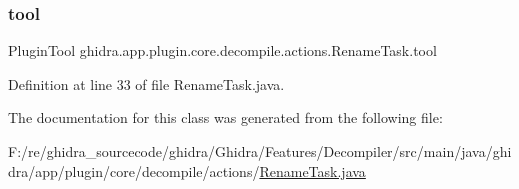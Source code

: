 \subsubsection{\texorpdfstring{tool}{tool}}
{\footnotesize\ttfamily Plugin\+Tool ghidra.\+app.\+plugin.\+core.\+decompile.\+actions.\+Rename\+Task.\+tool\hspace{0.3cm}{\ttfamily [protected]}}



Definition at line 33 of file Rename\+Task.\+java.



The documentation for this class was generated from the following file\+:\begin{DoxyCompactItemize}
\item 
F\+:/re/ghidra\+\_\+sourcecode/ghidra/\+Ghidra/\+Features/\+Decompiler/src/main/java/ghidra/app/plugin/core/decompile/actions/\mbox{\hyperlink{_rename_task_8java}{Rename\+Task.\+java}}\end{DoxyCompactItemize}
